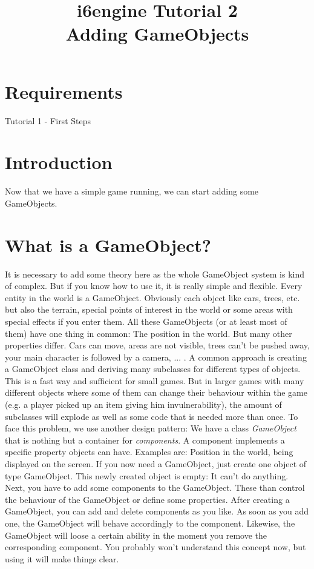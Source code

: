 \documentclass{article}
\title{i6engine Tutorial 2 \\ Adding GameObjects}
\begin{document}
\section{Requirements}

Tutorial 1 - First Steps

\section{Introduction}

Now that we have a simple game running, we can start adding some GameObjects.

\section{What is a GameObject?}

It is necessary to add some theory here as the whole GameObject system is kind of complex. But if you know how to use it, it is really simple and flexible.\newline
Every entity in the world is a GameObject. Obviously each object like cars, trees, etc. but also the terrain, special points of interest in the world or some areas with special effects if you enter them. All these GameObjects (or at least most of them) have one thing in common: The position in the world. But many other properties differ. Cars can move, areas are not visible, trees can't be pushed away, your main character is followed by a camera, ... . A common approach is creating a GameObject class and deriving many subclasses for different types of objects. This is a fast way and sufficient for small games. But in larger games with many different objects where some of them can change their behaviour within the game (e.g. a player picked up an item giving him invulnerability), the amount of subclasses will explode as well as some code that is needed more than once.\newline
To face this problem, we use another design pattern: We have a class \textit{GameObject} that is nothing but a container for \textit{components}. A component implements a specific property objects can have. Examples are: Position in the world, being displayed on the screen. If you now need a GameObject, just create one object of type GameObject. This newly created object is empty: It can't do anything. Next, you have to add some components to the GameObject. These than control the behaviour of the GameObject or define some properties. After creating a GameObject, you can add and delete components as you like. As soon as you add one, the GameObject will behave accordingly to the component. Likewise, the GameObject will loose a certain ability in the moment you remove the corresponding component. You probably won't understand this concept now, but using it will make things clear.
\end{document}
